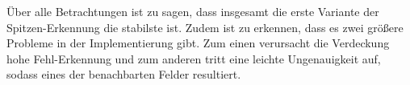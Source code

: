 Über alle Betrachtungen ist zu sagen, dass insgesamt die erste Variante der Spitzen-Erkennung die stabilste ist. Zudem ist zu erkennen, dass es zwei größere Probleme in der Implementierung gibt. Zum einen verursacht die Verdeckung hohe Fehl-Erkennung und zum anderen tritt eine leichte Ungenauigkeit auf, sodass eines der benachbarten Felder resultiert.


